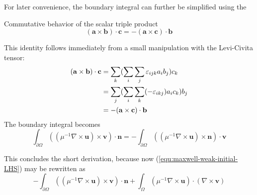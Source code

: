 \documentclass[11pt, a4paper]{article}
\begin{document}
For later convenience, the boundary integral can further be simplified using the
\begin{fancybox}{Commutative behavior of the scalar triple product}
    \begin{equation}
        (\mathbf{a} \times \mathbf{b}) \cdot \mathbf{c} = - (\mathbf{a} \times \mathbf{c}) \cdot \mathbf{b} \label{equ:vector-algebra}
    \end{equation}
\end{fancybox}
This identity follows immediately from a small manipulation with the Levi-Civita
tensor:
\begin{align}
    (\mathbf{a} \times \mathbf{b}) \cdot \mathbf{c} &= \sum_k (\sum_i \sum_j \varepsilon_{ijk} a_i b_j) c_k \notag \\
     &= \sum_j (\sum_i \sum_k (-\varepsilon_{ikj}) a_i c_k) b_j \notag \\ 
     &= - (\mathbf{a} \times \mathbf{c}) \cdot \mathbf{b} 
\end{align}
The boundary integral becomes 
\begin{equation}
    \int_{\partial \Omega} (({\mu^{-1} \nabla \times \mathbf{u}}) \times \mathbf{v}) \cdot \mathbf{n}
    = - \int_{\partial \Omega} (({\mu^{-1} \nabla \times \mathbf{u}}) \times \mathbf{n}) \cdot \mathbf{v}
\end{equation}

This concludes the short derivation, because now (\ref{equ:maxwell-weak-initial-LHS})
may be rewritten as
\begin{equation}
    - \int_{\partial \Omega} (({\mu^{-1} \nabla \times \mathbf{u}}) \times \mathbf{v}) \cdot \mathbf{n}
    + \int_{\Omega} ({\mu^{-1} \nabla \times \mathbf{u}}) \cdot (\nabla \times \mathbf{v})
\end{equation}

% 
\newpage

\end{document}
